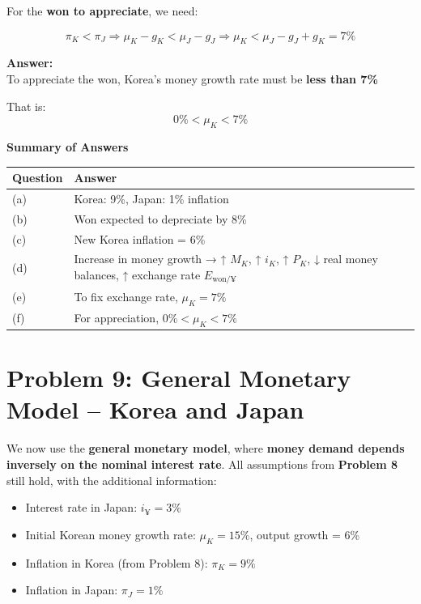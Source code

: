 \documentclass[
]{article}
\providecommand{\tightlist}{%
  \setlength{\itemsep}{0pt}\setlength{\parskip}{0pt}}
\begin{document}
For the \textbf{won to appreciate}, we need:

\[
\pi_K < \pi_J \Rightarrow \mu_K - g_K < \mu_J - g_J
\Rightarrow \mu_K < \mu_J - g_J + g_K = 7\%
\]

\textbf{Answer:}\\
To appreciate the won, Korea's money growth rate must be \textbf{less
than 7\%}

That is: \[
\boxed{0\% < \mu_K < 7\%}
\]

\textbf{Summary of Answers}

\begin{longtable}[]{@{}
  >{\raggedright\arraybackslash}p{}
  >{\raggedright\arraybackslash}p{}@{}}
\toprule\noalign{}
\begin{minipage}[b]{\linewidth}\raggedright
Question
\end{minipage} & \begin{minipage}[b]{\linewidth}\raggedright
Answer
\end{minipage} \\
\midrule\noalign{}
\endhead
\bottomrule\noalign{}
\endlastfoot
(a) & Korea: 9\%, Japan: 1\% inflation \\
(b) & Won expected to depreciate by 8\% \\
(c) & New Korea inflation = 6\% \\
(d) & Increase in money growth → ↑ \(M_K\), ↑ \(i_K\), ↑ \(P_K\), ↓ real
money balances, ↑ exchange rate \(E_{\text{won}/¥}\) \\
(e) & To fix exchange rate, \(\mu_K = 7\%\) \\
(f) & For appreciation, \(0\% < \mu_K < 7\%\) \\
\end{longtable}

\section{Problem 9: General Monetary Model -- Korea and
Japan}\label{problem-9-general-monetary-model-korea-and-japan}

We now use the \textbf{general monetary model}, where \textbf{money
demand depends inversely on the nominal interest rate}. All assumptions
from \textbf{Problem 8} still hold, with the additional information:

\begin{itemize}
\tightlist
\item
  Interest rate in Japan: \(i_{¥} = 3\%\)
\item
  Initial Korean money growth rate: \(\mu_K = 15\%\), output growth =
  6\%
\item
  Inflation in Korea (from Problem 8): \(\pi_K = 9\%\)
\item
  Inflation in Japan: \(\pi_J = 1\%\)
\end{itemize}
\end{document}
